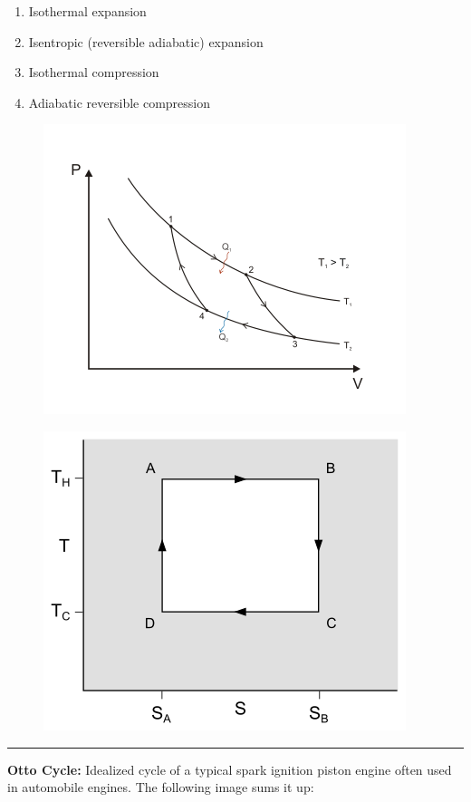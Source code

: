 \begin{enumerate}
    \item Isothermal expansion
    \item Isentropic (reversible adiabatic) expansion
    \item Isothermal compression
    \item Adiabatic reversible compression
\end{enumerate}
\begin{figure}[h]
    \centering
    \begin{minipage}{.5\textwidth}
      \centering
      \includegraphics[width=.6\linewidth]{Images/Carnot_P-V.png}
      \label{fig:test1}
    \end{minipage}%
    \begin{minipage}{.5\textwidth}
      \centering
      \includegraphics[width=.6\linewidth]{Images/Carnot_T-S.png}
      \label{fig:test2}
    \end{minipage}
\end{figure}
\begin{center}
\rule{.8\textwidth}{.5pt}
\end{center}
\textbf{Otto Cycle:} Idealized cycle of a typical spark ignition piston engine often used in automobile engines. The following image sums it up:
